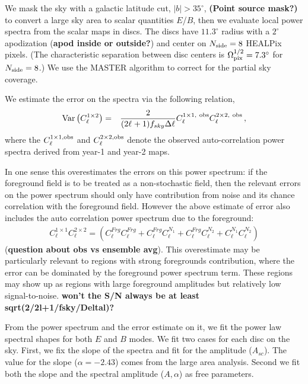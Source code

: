 \documentclass[a4paper,11pt]{article}
\begin{document}
We mask the sky with a galactic latitude cut, $|b|>35^{\circ}$, \textbf{(Point source mask?)} to convert a large sky area to scalar quantities $E$/$B$, then we evaluate local power spectra from the scalar maps in discs.  The discs have $11.3^{\circ}$ radius with a $2^{\circ}$ apodization (\textbf{apod inside or outside?}) and center on $N_{\rm side} = 8$ HEALPix pixels.  (The characteristic separation between disc centers is $\Omega_{\rm pix}^{1/2} = 7.3^\circ$ for $N_{\rm side} = 8$.)
We use the MASTER algorithm \citep{} to correct for the partial sky coverage.


We estimate the error on the spectra via the following relation,
\begin{eqnarray}
{\rm Var}\left( {C^{1 \times 2}_{\ell}} \right) &=&{\frac{2}{(2\ell_{}+1) f_{sky} \Delta \ell}} {C^{1\times 1,{\ \rm obs}}_{\ell} C^{2\times 2,{\ \rm obs}}_{\ell}}\,,
\end{eqnarray}
where the $C_{\ell}^{1\times 1,{\rm obs}}$ and $C_{\ell}^{2\times 2,{\rm obs}}$ denote the observed auto-correlation power spectra derived from year-1 and year-2 maps.

In one sense this overestimates the errors on this power spectrum: if the foreground field is to be treated as a non-stochastic field, then the relevant errors on the power spectrum should only have contribution from noise and its chance correlation with the foreground field.  However the above estimate of error also includes the auto correlation power spectrum due to the foreground: \begin{eqnarray}
C^{1 \times 1}_{\ell} C^{2\times 2}_{\ell} =
  \left( C^{Frg}_{\ell} C^{Frg}_{\ell} + C^{Frg}_{\ell} C^{N_1}_{\ell} + C^{Frg}_{\ell} C^{N_2}_{\ell} + C^{N_1}_{\ell} C^{N_2}_{\ell} \right)
\end{eqnarray}  (\textbf{question about obs vs ensemble avg}).
This overestimate may be particularly relevant to regions with strong foregrounds contribution, where the error can be dominated by the foreground power spectrum term. These regions may show up as regions with large foreground amplitudes but relatively low signal-to-noise. \textbf{won't the S/N always be at least sqrt(2/2l+1/fsky/Deltal)?}

From the power spectrum and the error estimate on it, we fit the power law spectral shapes for both $E$ and $B$ modes. We fit two cases for each disc on the sky.  First, we fix the slope of the spectra and fit for the amplitude ($A_{sc}$).  The value for the slope ($\alpha=-2.43$) comes from the large area analysis.  Second we fit both the slope and the spectral amplitude  ($A,\alpha$) as free parameters.
\end{document}
